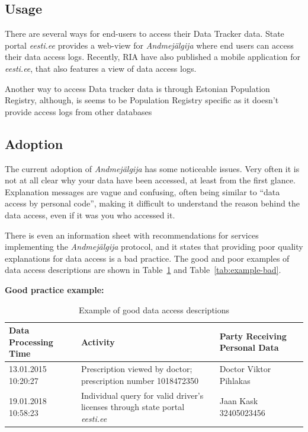 \subsection{Usage}
There are several ways for end-users to access their Data Tracker data. State portal \textit{eesti.ee} provides a web-view for \textit{Andmejälgija} where end users can access their data access logs. Recently, RIA have also published a mobile application for \textit{eesti.ee}, that also features a view of data access logs. 

Another way to access Data tracker data is through Estonian Population Registry, although, is seems to be Population Registry specific as it doesn't provide access logs from other databases



\subsection{Adoption}
The current adoption of \textit{Andmejälgija} has some noticeable issues. Very often it is not at all clear why your data have been accessed, at least from the first glance. Explanation messages are vague and confusing, often being similar to ``data access by personal code'', making it difficult to understand the reason behind the data access, even if it was you who accessed it.

There is even an information sheet with recommendations for services implementing the \textit{Andmejälgija} protocol, and it states that providing poor quality explanations for data access is a bad practice\cite{ria-andmejalgija-recommendations}. The good and poor examples of data access descriptions are shown in Table~\ref{tab:example-good} and Table~\ref{tab:example-bad}.

\textbf{Good practice example:}

\begin{table}[H]
\centering
\begin{tabular}{|p{3cm}|p{6cm}|p{4cm}|}
\hline
\textbf{Data Processing Time} & \textbf{Activity} & \textbf{Party Receiving Personal Data} \\
\hline
13.01.2015 10:20:27 & Prescription viewed by doctor; prescription number 1018472350 & Doctor Viktor Pihlakas \\
\hline
19.01.2018 10:58:23 & Individual query for valid driver's licenses through state portal \textit{eesti.ee} & Jaan Kask 32405023456 \\
\hline
\end{tabular}
\caption{Example of good data access descriptions\cite{ria-andmejalgija-recommendations}}
\label{tab:example-good}
\end{table}

